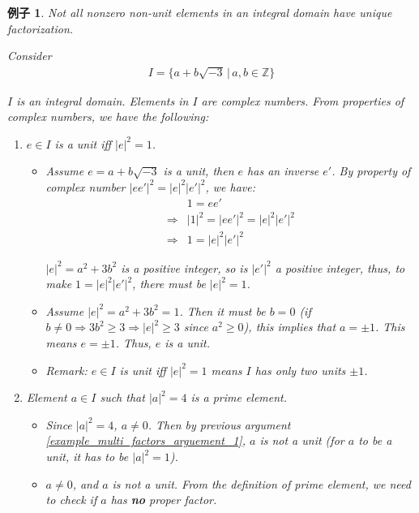 \documentclass[utf8]{ctexbook}
\newtheorem{example}{例子}[section]
\begin{document}
\begin{example}\label{example_unique_factorization_multi_factors}
Not all nonzero non-unit elements in an integral domain have unique factorization.

Consider
\begin{align*}
I = \{ a + b \sqrt{-3} \, |\, a, b \in \mathbb{Z} \}
\end{align*}

$I$ is an integral domain. Elements in $I$ are complex numbers. From properties of complex numbers, we have the following:
\begin{enumerate}
\item{$e \in I$ is a unit iff $|e|^2 = 1$. \label{example_multi_factors_arguement_1}}

\begin{itemize}
\item{Assume $e = a + b \sqrt{-3}$ is a unit, then $e$ has an inverse $e'$. By property of complex number $|e e'|^2 = |e|^2 |e'|^2$, we have:
\begin{align*}
& 1 = e e' \\
\Longrightarrow & |1 |^2 = |e e'|^2 =  |e|^2 |e'|^2 \\
\Longrightarrow & 1 = |e|^2 |e'|^2
\end{align*}

$|e|^2 = a^2 + 3 b^2$ is a positive integer, so is $|e'|^2$ a positive integer, thus, to make $1 = |e|^2 |e'|^2$, there must be $|e|^2 =1 $.
}
\item{Assume $|e|^2 = a^2 + 3 b^2 = 1$. Then it must be $b = 0$ (if $b \neq 0  \Longrightarrow 3b^2 \geq 3 \Longrightarrow |e|^2 \geq 3$ since $a^2 \geq 0$), this implies that $a = \pm 1$. This means $e = \pm 1 $. Thus, $e$ is a unit.}
\item{Remark: $e \in I$ is unit iff $|e|^2 = 1$ means $I$ has only two units $\pm 1$.}
\end{itemize}


\item{Element $a \in I$ such that $|a|^2 = 4$ is a prime element.\label{example_multi_factors_arguement_2}}

\begin{itemize}
\item{Since $|a|^2 = 4$, $a \neq 0$. Then by previous argument \ref{example_multi_factors_arguement_1}, $a$ is not a unit (for $a$ to be a unit, it has to be $|a|^2 = 1$). }
\item{$a \neq 0$, and $a$ is not a unit. From the definition of prime element, we need to check if $a$ has \textbf{no} proper factor.

}
\end{itemize}
\end{enumerate}
\end{example}
\end{document}

